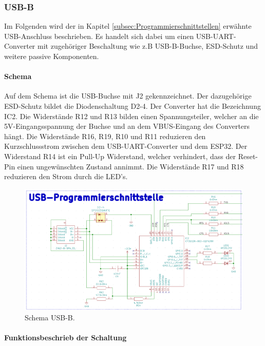 \subsubsection{USB-B}\label{subsubsec:USB-B}

Im Folgenden wird der in Kapitel \ref{subsec:Programmierschnittstellen} erwähnte USB-Anschluss beschrieben. Es handelt sich dabei um einen USB-UART-Converter mit zugehöriger Beschaltung wie z.B USB-B-Buchse, ESD-Schutz und weitere passive Komponenten.

\paragraph{Schema}\mbox{}

Auf dem Schema ist die USB-Buchse mit J2 gekennzeichnet. Der dazugehörige ESD-Schutz bildet die Diodenschaltung D2-4. Der Converter hat die Bezeichnung IC2. Die Widerstände R12 und R13 bilden einen Spannungsteiler, welcher an die 5V-Eingangsspannung der Buchse und an dem VBUS-Eingang des Converters hängt. Die Widerstände R16, R19, R10 und R11 reduzieren den Kurzschlussstrom zwischen dem USB-UART-Converter und dem ESP32. Der Widerstand R14 ist ein Pull-Up Widerstand, welcher verhindert, dass der Reset-Pin einen ungewünschten Zustand annimmt. Die Widerstände R17 und R18 reduzieren den Strom durch die LED's.

\begin{figure}[h!]
	\centering
	\includegraphics[width=1\textwidth]{graphics/Schema_USB_B}
	\caption{Schema USB-B.}
	\label{fig:Schema_USB_B}
\end{figure}

\paragraph{Funktionsbeschrieb der Schaltung}\mbox{}


